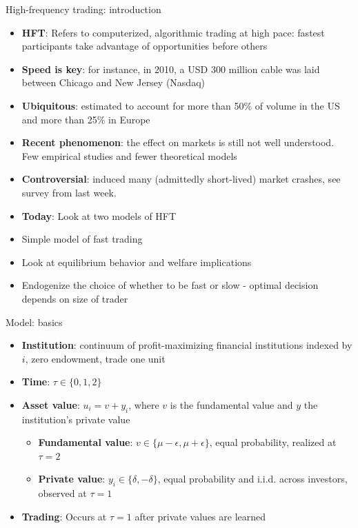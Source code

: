 \documentclass[english,10pt
,aspectratio=169
]{beamer}
\begin{document}
\begin{frame}{High-frequency trading: introduction}
	\begin{itemize}
		\item \textbf{HFT}: Refers to computerized, algorithmic trading at high pace: fastest participants take advantage of opportunities before others
		\item \textbf{Speed is key}: for instance, in 2010, a USD 300 million cable was laid between Chicago and New Jersey (Nasdaq)
		\item \textbf{Ubiquitous}: estimated to account for more than 50\% of volume in the US and more than 25\% in Europe
		\item \textbf{Recent phenomenon}: the effect on markets is still not well understood. Few empirical studies and fewer theoretical models
		\item \textbf{Controversial}: induced many (admittedly short-lived) market crashes, see survey from last week.
		\item \textbf{Today}: Look at two models of HFT
	\end{itemize}
\end{frame}


\begin{frame}{\citet*{biais_equilibrium_2015}}
\begin{itemize}
	\item Simple model of fast trading
	\item Look at equilibrium behavior and welfare implications
	\item Endogenize the choice of whether to be fast or slow - optimal decision depends on size of trader
\end{itemize}
\end{frame}


\begin{frame}{Model: basics}
	\begin{itemize}
		\item \textbf{Institution}: continuum of profit-maximizing financial institutions indexed by $i$, zero endowment, trade one unit 
		\item \textbf{Time}: $\tau \in \{0,1,2\}$
		\item \textbf{Asset value}: $u_{i}=v+y_{i}$, where $v$ is the fundamental value and $y$ the institution's private value 
		\begin{itemize}
			\item \textbf{Fundamental value}: $v \in \{\mu-\epsilon, \mu + \epsilon\}$, equal probability, realized at $\tau=2$
			\item \textbf{Private value}: $y_{i} \in \{\delta, -\delta\}$, equal probability and i.i.d. across investors, observed at $\tau=1$ 
		\end{itemize}
		\item \textbf{Trading}: Occurs at $\tau=1$ after private values are learned
	\end{itemize}
\end{frame}
\end{document}
